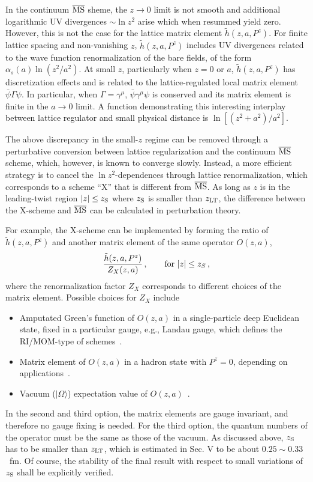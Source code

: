 In the continuum ${\overline{\rm MS}}$ sheme, the $z\rightarrow 0$ limit is not smooth and
additional logarithmic UV divergences $\sim \ln z^2$ arise which
when resummed yield zero.  However, this is not the case for the lattice matrix element
$\tilde h(z,a, P^z)$. For finite lattice spacing and non-vanishing $z$,
$\tilde h(z,a, P^z)$ includes UV divergences related to the wave function
renormalization of the bare fields, of the form
$\alpha_s(a)\ln (z^2/a^2)$.
At small $z$, particularly when $z=0$ or $a$, $\tilde h(z,a, P^z)$ has discretization effects
and is related to the
lattice-regulated local matrix element ${\bar\psi}\Gamma \psi$.
In particular, when $\Gamma=\gamma^\mu$,
${\bar\psi}\gamma^\mu \psi$ is conserved and its matrix element is finite
in the $a\to 0$ limit. A function demonstrating this interesting
interplay between lattice regulator and small physical distance
is $\ln [(z^2+a^2)/a^2]$.

The above discrepancy in the small-$z$ regime can be removed through a perturbative conversion between lattice regularization and the continuum ${\overline{\rm MS}}$ scheme, which, however, is known to converge slowly. Instead, a more efficient strategy is to cancel the $\ln z^2$-dependences through lattice renormalization, which corresponds to a scheme ``X'' that is different from ${\overline{\rm MS}}$.
As long as $z$ is in the leading-twist region $|z|\le z_{\rm S}$ where $z_{\rm S}$ is
smaller than $z_{\rm LT}$, the difference between the X-scheme and ${\overline{\rm MS}}$ can be calculated in perturbation theory.

For example, the X-scheme can be implemented by forming the ratio of $\tilde h(z,a, P^z)$ and another
matrix element of the same operator $O(z,a)$,
\begin{align}\label{eq:ratio}
 \frac{\tilde h(z,a,P^z)}{Z_X(z,a)}\,,~~~~~~{\rm for\ }|z|\le z_{S}\,,
\end{align}
where the renormalization factor $Z_X$ corresponds to different choices of the matrix element.
Possible choices for $Z_X$ include
\begin{itemize}
\item{Amputated Green's function of $O(z,a)$ in a single-particle deep Euclidean state, fixed in a particular gauge, e.g., Landau gauge, which defines the RI/MOM-type of schemes~\cite{Constantinou:2017sej,Stewart:2017tvs,Alexandrou:2017huk,Chen:2017mzz}.}
\item{Matrix element of $O(z,a)$ in a hadron state with $P^z=0$, depending on applications~\cite{Radyushkin:2017cyf,Orginos:2017kos}.}
\item{Vacuum ($|\Omega\rangle$) expectation value of $O(z,a)$~\cite{Braun:2018brg,Li:2020xml}.}
\end{itemize}
In the second and third option, the matrix elements are gauge invariant,
and therefore no gauge fixing is needed. For the third option, the quantum numbers of the operator must be the same as those of the vacuum.
As discussed above, $z_{\rm S}$ has to be smaller than $z_{\rm LT}$, which is estimated in Sec. V to be about
$0.25 \sim 0.33$~fm. Of course, the stability of the final result with respect to small variations of $z_{\rm S}$ shall be explicitly verified.

